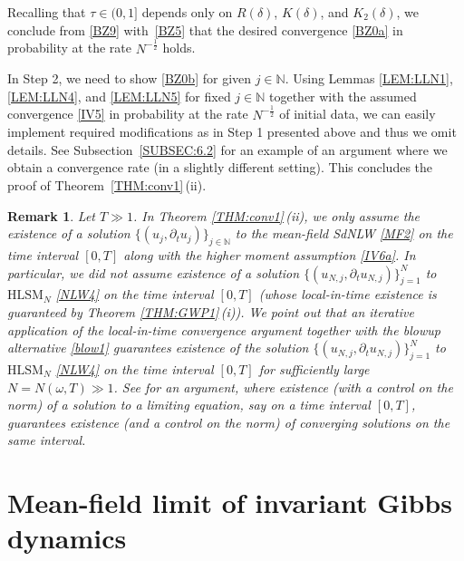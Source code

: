 \documentclass[letterpaper, 11pt,  reqno]{amsart}
\newtheorem{remark}[theorem]{Remark}
\newcommand{\1}{\hspace{0.5mm}\text{I}\hspace{0.2mm}}
\newcommand{\noi}{\noindent}
\newcommand{\N}{\mathbb{N}}
\newcommand{\dl}{\delta}
\newcommand{\dt}{\partial_t}
\newcommand{\HLS}{$\text{HLSM}_N$ }
\renewcommand{\o}{\omega}
\numberwithin{equation}{section}
\numberwithin{theorem}{section}
\begin{document}
\noi
Recalling that 
$\tau \in (0, 1]$ depends only on 
$R(\dl)$, $K(\dl)$, and $K_2(\dl)$, 
we conclude from \eqref{BZ9} with~\eqref{BZ5}
that the desired convergence 
\eqref{BZ0a} in probability at the rate $N^{-\frac 12}$
holds.








In Step 2, we need to show \eqref{BZ0b}
for given  $j \in \N$.
Using 
Lemmas \ref{LEM:LLN1}, 
\ref{LEM:LLN4},  and
\ref{LEM:LLN5}
for fixed $j \in \N$
together with the assumed convergence 
\eqref{IV5} in probability at the rate $N^{-\frac 12}$ of initial data, 
we can easily implement required modifications
as in Step 1 presented above
and thus we omit details.
See Subsection~\ref{SUBSEC:6.2}
for an example of an argument where we obtain a convergence  rate
(in a slightly different setting).
This concludes the proof of Theorem~\ref{THM:conv1}\,(ii).



\begin{remark}
\rm 
Let $T \gg 1$.
In Theorem \ref{THM:conv1}\,(ii), 
we only assume the existence of a solution 
$\{(u_j, \dt u_j)\}_{j \in \N}$
to the mean-field SdNLW \eqref{MF2}
on the time interval $[0, T]$ along with the higher moment assumption 
\eqref{IV6a}.
In particular, 
we did not assume existence
of a solution
$\{ (u_{N, j}, \dt  u_{N, j})\}_{j = 1}^N$
 to \HLS \eqref{NLW4} 
on the time interval $[0, T]$
(whose local-in-time existence
is guaranteed by Theorem \ref{THM:GWP1}\,(i)).
We point out that an iterative application
of the local-in-time convergence argument
together with 
the blowup alternative
\eqref{blow1}
guarantees existence of 
the solution $\{ (u_{N, j}, \dt  u_{N, j})\}_{j = 1}^N$
 to \HLS \eqref{NLW4} 
on the time interval $[0, T]$
for sufficiently large $N = N(\o, T)\gg 1$.
See
\cite{LLOT}
for  an argument, 
where 
existence 
(with a control on the norm)
of a solution to a limiting equation, 
say on a time interval $[0, T]$, 
guarantees existence
(and a control on the norm)
of converging solutions on the same interval.



\end{remark}






\section{Mean-field limit of invariant Gibbs dynamics} 
\label{SEC:6}
\end{document}
